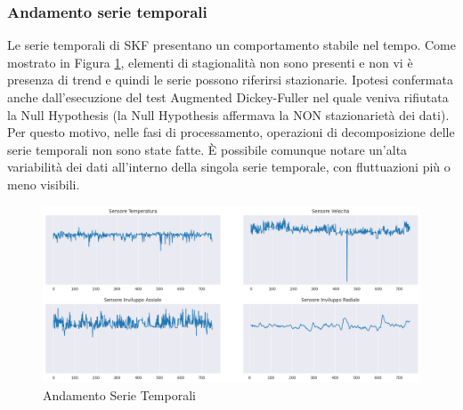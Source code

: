 \subsubsection{Andamento serie temporali}
Le serie temporali di SKF presentano un comportamento stabile nel tempo. Come mostrato in Figura \ref{sensors_plot}, elementi di stagionalità non sono presenti e non vi è presenza di trend e quindi le serie possono riferirsi stazionarie. Ipotesi confermata anche dall'esecuzione del test Augmented Dickey-Fuller nel quale veniva rifiutata la Null Hypothesis (la Null Hypothesis affermava la NON stazionarietà dei dati).
Per questo motivo, nelle fasi di processamento, operazioni di decomposizione delle serie temporali non sono state fatte.
È possibile comunque notare un'alta variabilità dei dati all'interno della singola serie temporale, con fluttuazioni più o meno visibili.
\begin{figure}[t]
	\centering
	\includegraphics[width=14cm, scale=1]{images/sensors_plot}
	\caption{Andamento Serie Temporali}
	\label{sensors_plot}
		
\end{figure}

